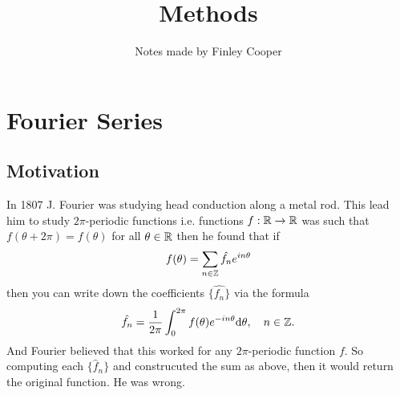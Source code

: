 \documentclass{article}
\title{Methods}
\author{Notes made by Finley Cooper}
\begin{document}
\maketitle
\newpage
\tableofcontents
\newpage
\section{Fourier Series}
\subsection{Motivation}
In 1807 J. Fourier was studying head conduction along a metal rod. This lead him to study $ 2\pi $-periodic functions i.e. functions $ f:\mathbb{R}\to \mathbb{R} $ was such that $ f(\theta+2\pi)=f(\theta) $ for all $ \theta\in \mathbb{R} $ then he found that if \[
	f(\theta)=\sum_{n\in\mathbb{Z}}\hat{f_n}e^{in\theta}
\]
then you can write down the coefficients $ \{\hat{f_n}\} $ via the formula
\[
	\hat{f_n}=\frac 1{2\pi}\int_{0}^{2\pi}f(\theta)e^{-in\theta}\mathrm d\theta,\quad n\in \mathbb{Z}.
\]
And Fourier believed that this worked for any $ 2\pi $-periodic function $ f $. So computing each $ \{\hat{f}_n\} $ and construcuted the sum as above, then it would return the original function. He was wrong.
\end{document}
